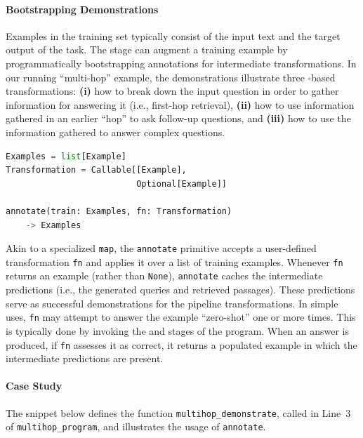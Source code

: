 \paragraph{Bootstrapping Demonstrations} Examples in the training set typically consist of the input text and the target output of the task. The \demonstrate stage can augment a training example by programmatically bootstrapping annotations for intermediate transformations. In our running ``multi-hop'' example, the demonstrations illustrate three \LM{}-based transformations: \textbf{(i)} how to break down the input question in order to gather information for answering it (i.e., first-hop retrieval), \textbf{(ii)} how to use information gathered in an earlier ``hop'' to ask follow-up questions, and \textbf{(iii)} how to use the information gathered to answer complex questions.

\begin{samepage}
\begin{lstlisting}[language=Python,breaklines=true,showstringspaces=false]
Examples = list[Example]
Transformation = Callable[[Example],
                          Optional[Example]]

annotate(train: Examples, fn: Transformation)
    -> Examples
\end{lstlisting}
\end{samepage}


Akin to a specialized \texttt{map}, the \texttt{annotate} primitive accepts a user-defined transformation \texttt{fn} and applies it over a list of training examples. Whenever \texttt{fn} returns an example (rather than \texttt{None}), \texttt{annotate} caches the intermediate predictions (i.e., the generated queries and retrieved passages). These predictions serve as successful demonstrations for the pipeline transformations. In simple uses, \texttt{fn} may attempt to answer the example ``zero-shot'' one or more times. This is typically done by invoking the \search and \predict stages of the program. When an answer is produced, if \texttt{fn} assesses it as correct, it returns a populated example in which the intermediate predictions are present.

\vspace{-2mm}
\paragraph{Case Study}

The snippet below defines the function \texttt{multihop\_demonstrate}, called in Line~3 of \texttt{multihop\_program}, and illustrates the usage of \texttt{annotate}.

